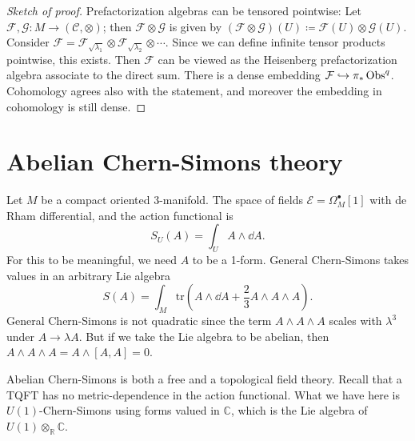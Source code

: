 \begin{example}
\begin{proof}[Sketch of proof]
		Prefactorization algebras can be tensored pointwise: Let $\mathcal{F} ,\mathcal{G} : M \to (\mathcal{C},\otimes ) $; then $\mathcal{F} \otimes \mathcal{G} $ is given by $(\mathcal{F} \otimes \mathcal{G} )(U)\coloneqq \mathcal{F} (U)\otimes \mathcal{G} (U)$. Consider $\mathcal{F} =\mathcal{F} _{\sqrt{\lambda _1} } \otimes \mathcal{F} _{\sqrt{\lambda _2} } \otimes \cdots $. Since we can define infinite tensor products pointwise, this exists. Then $\mathcal{F} $ can be viewed as the Heisenberg prefactorization algebra associate to the direct sum. There is a dense embedding $\mathcal{F} \hookrightarrow \pi _*\operatorname{Obs}^q$. Cohomology agrees also with the statement, and moreover the embedding in cohomology is still dense.
	\end{proof}
\end{example}

\chapter{Abelian Chern-Simons theory}


Let $M$ be a compact oriented 3-manifold. The space of fields $\mathcal{E} =\Omega ^{\bullet} _M[1]$ with de Rham differential, and the action functional is
\[
	S_U(A) = \int_{U} A\wedge \dd A
.\]
For this to be meaningful, we need $A$ to be a 1-form. General Chern-Simons takes values in an arbitrary Lie algebra
\[
	S(A) = \int_{M} \mathrm{tr} \left(A\wedge  \dd A + \frac{2}{3} A\wedge A\wedge A\right)
.\]
General Chern-Simons is not quadratic since the term $A\wedge A\wedge A$ scales with $\lambda ^3$ under $A\to \lambda A$. But if we take the Lie algebra to be abelian, then $A\wedge A\wedge A=A\wedge [A,A]=0$.

Abelian Chern-Simons is both a free and a topological field theory. Recall that a TQFT has no metric-dependence in the action functional. What we have here is $U(1)$-Chern-Simons using forms valued in $\mathbb{C} $, which is the Lie algebra of $U(1)\otimes _\mathbb{R} \mathbb{C} $.

